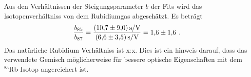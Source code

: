 Aus den Verhältnissen der Steigungsparameter $b$ der Fits wird das
Isotopenverhältniss von dem Rubidiumgas abgeschätzt. 
Es beträgt
\begin{equation}
	\frac{b_{85}}{b_{87}} =
	\frac{\SI{10.7+-9.0}{\second\per\volt}}{\SI{6.6+-3.5}{\second\per\volt}} =
	\num{1.6 +- 1.6} \ .
\end{equation}
Das natürliche Rubidium Verhältniss ist x:x.
Dies ist ein hinweis darauf, dass das verwendete Gemisch möglicherweise für
bessere optische Eigenschaften mit dem $^{85}$Rb Isotop angereichert ist. 
